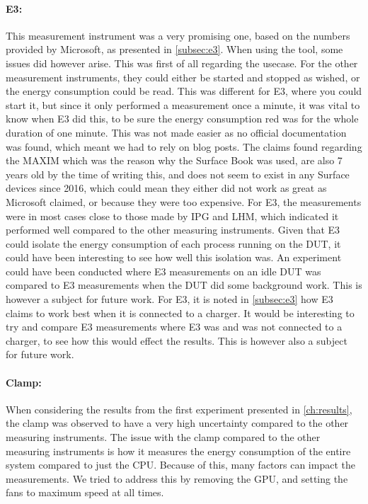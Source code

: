 \paragraph*{E3:} This measurement instrument was a very promising one, based on the numbers provided by Microsoft, as presented in \cref{subsec:e3}. When using the tool, some issues did however arise. This was first of all regarding the usecase. For the other measurement instruments, they could either be started and stopped as wished, or the energy consumption could be read. This was different for E3, where you could start it, but since it only performed a measurement once a minute, it was vital to know when E3 did this, to be sure the energy consumption red was for the whole duration of one minute. This was not made easier as no official documentation was found, which meant we had to rely on blog posts. The claims found regarding the MAXIM which was the reason why the Surface Book was used, are also 7 years old by the time of writing this, and does not seem to exist in any Surface devices since 2016, which could mean they either did not work as great as Microsoft claimed, or because they were too expensive. For E3, the measurements were in most cases close to those made by IPG and LHM, which indicated it performed well compared to the other measuring instruments. Given that E3 could isolate the energy consumption of each process running on the DUT, it could have been interesting to see how well this isolation was. An experiment could have been conducted where E3 measurements on an idle DUT was compared to E3 measurements when the DUT did some background work. This is however a subject for future work. For E3, it is noted in \cref{subsec:e3} how E3 claims to work best when it is connected to a charger. It would be interesting to try and compare E3 measurements where E3 was and was not connected to a charger, to see how this would effect the results. This is however also a subject for future work.


\paragraph*{Clamp:} When considering the results from the first experiment presented in \cref{ch:results}, the clamp was observed to have a very high uncertainty compared to the other measuring instruments. The issue with the clamp compared to the other measuring instruments is how it measures the energy consumption of the entire system compared to just the CPU. Because of this, many factors can impact the measurements. We tried to address this by removing the GPU, and setting the fans to maximum speed at all times.


